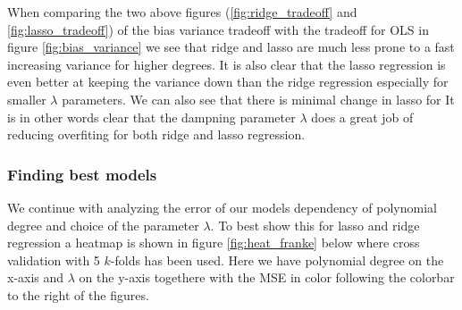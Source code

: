 \documentclass[12pt]{article}
\begin{document}
When comparing the two above figures (\ref{fig:ridge_tradeoff} and \ref{fig:lasso_tradeoff}) of the bias variance tradeoff with the tradeoff for OLS in figure \ref{fig:bias_variance} we see that ridge and lasso are much less prone to a fast increasing variance for higher degrees. It is also clear that the lasso regression is even better at keeping the variance down than the ridge regression especially for smaller $\lambda$ parameters. We can also see that there is minimal change in lasso for  It is in other words clear that the dampning parameter $\lambda$ does a great job of reducing overfiting for both ridge and lasso regression.

\subsubsection{Finding best models}
We continue with analyzing the error of our models dependency of polynomial degree and choice of the parameter $\lambda$. To best show this for lasso and ridge regression a heatmap is shown in figure \ref{fig:heat_franke} below where cross validation with 5 $k$-folds has been used. Here we have polynomial degree on the x-axis and $\lambda$ on the y-axis togethere with the MSE in color following the colorbar to the right of the figures.
\end{document}
